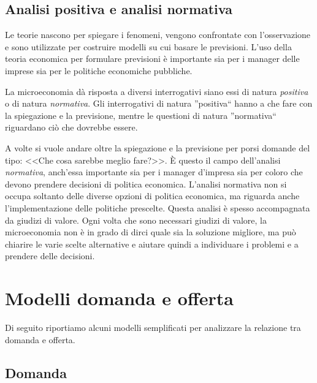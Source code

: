 \subsection{Analisi positiva e analisi normativa}

Le teorie nascono per spiegare i fenomeni, vengono confrontate con 
l'osservazione e sono utilizzate per costruire modelli su cui basare le 
previsioni. L'uso della teoria economica per formulare previsioni è 
importante sia per i manager delle imprese sia per le politiche economiche 
pubbliche. 

La microeconomia dà risposta a diversi interrogativi siano essi di natura 
\emph{positiva} o di natura \emph{normativa}. Gli interrogativi di natura 
''positiva`` hanno a che fare con la spiegazione e la previsione, mentre le 
questioni di natura ''normativa`` riguardano ciò che dovrebbe essere.

A volte si vuole andare oltre la spiegazione e la previsione per porsi 
domande del tipo: <<Che cosa sarebbe meglio fare?>>. 
È questo il campo dell'analisi \emph{normativa}, anch'essa importante sia per 
i manager d'impresa sia per coloro che devono prendere decisioni di politica 
economica. 
L'analisi normativa non si occupa soltanto delle diverse opzioni di politica 
economica, ma riguarda anche l'implementazione delle politiche prescelte. 
Questa analisi è spesso accompagnata da giudizi di valore. Ogni volta che 
sono necessari giudizi di valore, la microeconomia non è in grado di dirci 
quale sia la soluzione migliore, ma può chiarire le varie scelte 
alternative e aiutare quindi a individuare i problemi e a prendere delle 
decisioni.

\section{Modelli domanda e offerta}
\label{sec:modelli_modelli_domanda_offerta}

Di seguito riportiamo alcuni modelli semplificati per analizzare la relazione 
tra domanda e offerta.


\subsection{Domanda}
\label{subsec:modelli_domanda}

